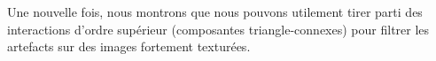 Une nouvelle fois, nous montrons que nous pouvons utilement tirer parti des interactions d'ordre supérieur (composantes triangle-connexes) pour filtrer les artefacts sur des images fortement texturées.








































